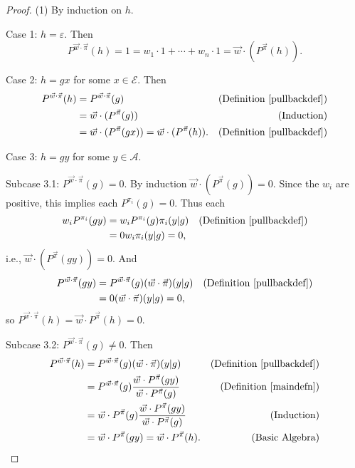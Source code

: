 \documentclass[twoside]{article}
\begin{document}
\begin{proof}
    (1) By induction on $h$.

    Case 1: $h=\varepsilon$. Then
    \[
        P^{\vec w\cdot\vec\pi}(h)=1=w_1\cdot 1+\cdots+w_n\cdot 1
        =
        \vec w\cdot ({P^{\vec\pi}}(h)).
    \]

    Case 2: $h=gx$ for some $x\in\mathcal E$. Then
    \begin{align*}
        P^{\vec w\cdot\vec\pi}(h)
            &= P^{\vec w\cdot\vec\pi}(g)
                &\mbox{(Definition \ref{pullbackdef})}\\
            &= \vec w\cdot({P^{\vec\pi}}(g))
                &\mbox{(Induction)}\\
            &= \vec w\cdot({P^{\vec\pi}}(gx))= \vec w\cdot({P^{\vec\pi}}(h)).
                &\mbox{(Definition \ref{pullbackdef})}
    \end{align*}

    Case 3: $h=gy$ for some $y\in\mathcal A$.

    Subcase 3.1: $P^{\vec w\cdot\vec\pi}(g)=0$.
        By induction $\vec w\cdot({P^{\vec\pi}}(g))=0$.
        Since the $w_i$ are positive, this implies
        each $P^{\pi_i}(g)=0$.
        Thus each
        \begin{align*}
            w_i P^{\pi_i}(gy)
                &= w_i P^{\pi_i}(g)\pi_i(y|g)
                    &\mbox{(Definition \ref{pullbackdef})}\\
                &= 0w_i\pi_i(y|g)=0,
        \end{align*}
        i.e., $\vec w\cdot({P^{\vec\pi}}(gy))=0$.
        And
        \begin{align*}
            P^{\vec w\cdot\vec\pi}(gy)
                &= P^{\vec w\cdot\vec\pi}(g)(\vec w\cdot\vec\pi)(y|g)
                    &\mbox{(Definition \ref{pullbackdef})}\\
                &= 0(\vec w\cdot\vec\pi)(y|g) = 0,
        \end{align*}
        so $P^{\vec w\cdot\vec\pi}(h)=\vec w\cdot P^{\vec\pi}(h)=0$.

    Subcase 3.2: ${P^{\vec w\cdot\vec\pi}}(g)\not=0$. Then
    \begin{align*}
        P^{\vec w\cdot\vec\pi}(h)
            &= P^{\vec w\cdot\vec\pi}(g)(\vec w\cdot\vec\pi)(y|g)
                &\mbox{(Definition \ref{pullbackdef})}\\
            &= P^{\vec w\cdot\vec\pi}(g)
                \frac
                {\vec w\cdot {P^{\vec\pi}}(gy)}
                {\vec w\cdot {P^{\vec\pi}}(g)}
                &\mbox{(Definition \ref{maindefn})}\\
            &= \vec w\cdot {P^{\vec\pi}}(g)
                \frac
                {\vec w\cdot {P^{\vec\pi}}(gy)}
                {\vec w\cdot {P^{\vec\pi}}(g)}
                &\mbox{(Induction)}\\
            &= \vec w\cdot {P^{\vec\pi}}(gy) = \vec w\cdot {P^{\vec\pi}}(h).
                &\mbox{(Basic Algebra)}
    \end{align*}


\end{proof}
\end{document}
